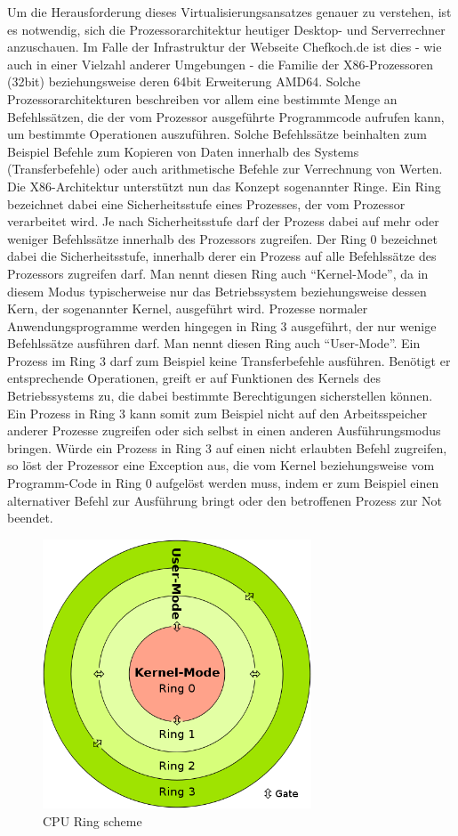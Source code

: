 Um die Herausforderung dieses Virtualisierungsansatzes genauer zu verstehen, ist es notwendig, sich die Prozessorarchitektur heutiger Desktop- und Serverrechner anzuschauen. Im Falle der Infrastruktur der Webseite Chefkoch.de ist dies - wie auch in einer Vielzahl anderer Umgebungen - die Familie der X86-Prozessoren (32bit) beziehungsweise deren 64bit Erweiterung AMD64. Solche Prozessorarchitekturen beschreiben vor allem eine bestimmte Menge an Befehlssätzen, die der vom Prozessor ausgeführte Programmcode aufrufen kann, um bestimmte Operationen auszuführen. Solche Befehlssätze beinhalten zum Beispiel Befehle zum Kopieren von Daten innerhalb des Systems (Transferbefehle) oder auch arithmetische Befehle zur Verrechnung von Werten. Die X86-Architektur unterstützt nun das Konzept sogenannter Ringe. Ein Ring bezeichnet dabei eine Sicherheitsstufe eines Prozesses, der vom Prozessor verarbeitet wird. Je nach Sicherheitsstufe darf der Prozess dabei auf mehr oder weniger Befehlssätze innerhalb des Prozessors zugreifen. Der Ring 0 bezeichnet dabei die Sicherheitsstufe, innerhalb derer ein Prozess auf alle Befehlssätze des Prozessors zugreifen darf. Man nennt diesen Ring auch "`Kernel-Mode"', da in diesem Modus typischerweise nur das Betriebssystem beziehungsweise dessen Kern, der sogenannter Kernel, ausgeführt wird. Prozesse normaler Anwendungsprogramme werden hingegen in Ring 3 ausgeführt, der nur wenige Befehlssätze ausführen darf. Man nennt diesen Ring auch "`User-Mode"'. Ein Prozess im Ring 3 darf zum Beispiel keine Transferbefehle ausführen. Benötigt er entsprechende Operationen, greift er auf Funktionen des Kernels des Betriebssystems zu, die dabei bestimmte Berechtigungen sicherstellen können. Ein Prozess in Ring 3 kann somit zum Beispiel nicht auf den Arbeitsspeicher anderer Prozesse zugreifen oder sich selbst in einen anderen Ausführungsmodus bringen. Würde ein Prozess in Ring 3 auf einen nicht erlaubten Befehl zugreifen, so löst der Prozessor eine Exception aus, die vom Kernel beziehungsweise vom Programm-Code in Ring 0 aufgelöst werden muss, indem er zum Beispiel einen alternativer Befehl zur Ausführung bringt oder den betroffenen Prozess zur Not beendet.

\begin{figure}[!ht]
  \begin{center}
    \includegraphics[width=8cm]{bilder/500px-CPU_ring_scheme.png}
    \caption{CPU Ring scheme \citep{wiki:006}}
  \end{center}
\end{figure}

